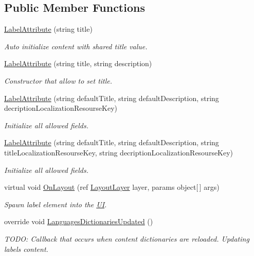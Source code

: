 \subsection*{Public Member Functions}
\begin{DoxyCompactItemize}
\item 
\mbox{\hyperlink{class_wpf_handler_1_1_u_i_1_1_auto_layout_1_1_controls_1_1_label_attribute_af52c1a4d96d9ab17f369a6c6423f58fb}{Label\+Attribute}} (string title)
\begin{DoxyCompactList}\small\item\em Auto initialize content with shared title value. \end{DoxyCompactList}\item 
\mbox{\hyperlink{class_wpf_handler_1_1_u_i_1_1_auto_layout_1_1_controls_1_1_label_attribute_a961e0cd1faee5baad4ced251193adcc4}{Label\+Attribute}} (string title, string description)
\begin{DoxyCompactList}\small\item\em Constructor that allow to set title. \end{DoxyCompactList}\item 
\mbox{\hyperlink{class_wpf_handler_1_1_u_i_1_1_auto_layout_1_1_controls_1_1_label_attribute_ae3fc540124479e4cdc343ab23ae1a1c9}{Label\+Attribute}} (string default\+Title, string default\+Description, string decription\+Localization\+Resourse\+Key)
\begin{DoxyCompactList}\small\item\em Initialize all allowed fields. \end{DoxyCompactList}\item 
\mbox{\hyperlink{class_wpf_handler_1_1_u_i_1_1_auto_layout_1_1_controls_1_1_label_attribute_abfc5ebdb910630168db5f10fdbb713b7}{Label\+Attribute}} (string default\+Title, string default\+Description, string title\+Localization\+Resourse\+Key, string decription\+Localization\+Resourse\+Key)
\begin{DoxyCompactList}\small\item\em Initialize all allowed fields. \end{DoxyCompactList}\item 
virtual void \mbox{\hyperlink{class_wpf_handler_1_1_u_i_1_1_auto_layout_1_1_controls_1_1_label_attribute_a70b5b79babc0fd60171ba08231ce2a5c}{On\+Layout}} (ref \mbox{\hyperlink{class_wpf_handler_1_1_u_i_1_1_auto_layout_1_1_layout_layer}{Layout\+Layer}} layer, params object\mbox{[}$\,$\mbox{]} args)
\begin{DoxyCompactList}\small\item\em Spawn label element into the \mbox{\hyperlink{namespace_wpf_handler_1_1_u_i}{UI}}. \end{DoxyCompactList}\item 
override void \mbox{\hyperlink{class_wpf_handler_1_1_u_i_1_1_auto_layout_1_1_controls_1_1_label_attribute_a3ed5f61dc946ffd5ce385cc4ef60362d}{Languages\+Dictionaries\+Updated}} ()
\begin{DoxyCompactList}\small\item\em T\+O\+DO\+: Callback that occurs when content dictionaries are reloaded. Updating label\textquotesingle{}s content. \end{DoxyCompactList}\end{DoxyCompactItemize}
